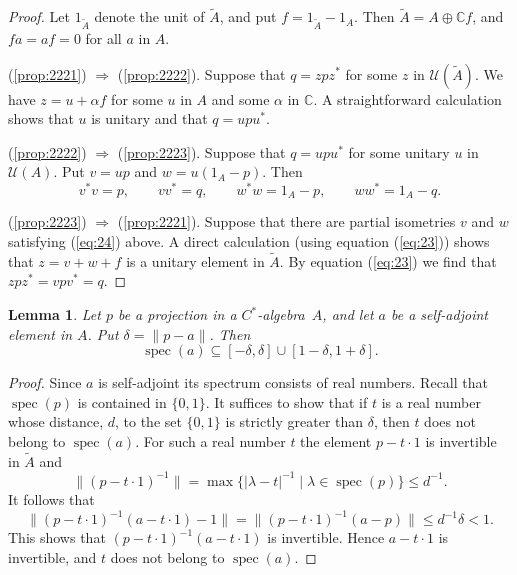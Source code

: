 \documentclass{book}
\newtheorem{lemma}[definition]{Lemma}
\def\cstar{\(C^*\)-algebra}
\begin{document}
\begin{proof}
  Let \(1_{\widetilde{A}}\) denote the unit of \(\widetilde{A}\), and put \(f=1_{\widetilde{A}}-1_A\).
  Then \(\widetilde{A}=A\oplus\mathbb{C}f\), and \(fa=af=0\) for all \(a\) in \(A\).\par
  (\ref{prop:2221}) \(\Rightarrow\) (\ref{prop:2222}). Suppose that \(q=z p z^*\) for some \(z\) in \(\mathcal{U}(\widetilde{A})\). We have 
    \(z=u+\alpha f\) for some \(u\) in \(A\) and some \(\alpha\) in \(\mathbb{C}\). A straightforward calculation shows that \(u\) is unitary and that \(q=up u^*\).\par
  (\ref{prop:2222}) \(\Rightarrow\) (\ref{prop:2223}). Suppose that \(q=up u^*\) for some unitary \(u\) in \(\mathcal{U}(A)\). Put \(v=up\) and \(w=u(1_A-p)\). Then
  \begin{equation}\label{eq:24}
    v^* v=p,\qquad v v^*=q,\qquad w^* w=1_A-p,\qquad w w^*=1_A-q.
  \end{equation}\par
  (\ref{prop:2223}) \(\Rightarrow\) (\ref{prop:2221}). Suppose that there are partial isometries \(v\) and \(w\) satisfying (\ref{eq:24}) above. A direct calculation (using equation (\ref{eq:23})) 
  shows that \(z=v+w+f\) is a unitary element in \(\widetilde{A}\). By equation (\ref{eq:23}) we find that \(zp z^*=vp v^*=q\).
\end{proof}
\begin{lemma}\label{lemma:523}
  Let \(p\) be a projection in a \cstar\ \(A\), and let \(a\) be a self-adjoint element in \(A\). Put \(\delta=\|p-a\|\). Then
  \[
    \operatorname{spec}(a)\subseteq[-\delta,\delta]\cup [1-\delta,1+\delta].
  \]
\end{lemma}
\begin{proof}
  Since \(a\) is self-adjoint its spectrum consists of real numbers. Recall that \(\operatorname{spec}(p)\) is contained in \(\{0,1\}\).
  It suffices to show that if \(t\) is a real number whose distance, \(d\), to the set \(\{0,1\}\) is strictly greater than \(\delta\),
  then \(t\) does not belong to \(\operatorname{spec}(a)\). For such a real number \(t\) the element \(p-t\cdot 1\) is invertible in \(\widetilde{A}\) and
  \[
    \|{(p-t\cdot 1)}^{-1}\|=\max\{|\lambda-t|^{-1}\mid\lambda\in\operatorname{spec}(p)\}\leq d^{-1}.
  \]
  It follows that
  \[
    \|{(p-t\cdot 1)}^{-1}(a-t\cdot 1)-1\|=\|{(p-t\cdot 1)}^{-1}(a-p)\|\leq d^{-1}\delta<1.
  \]
  This shows that \({(p-t\cdot 1)}^{-1}(a-t\cdot 1)\) is invertible. Hence \(a-t\cdot 1\) is invertible, and \(t\) does not belong to \(\operatorname{spec}(a)\).
\end{proof}
\end{document}
